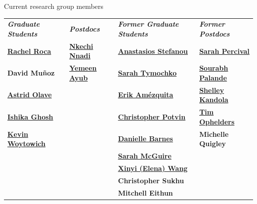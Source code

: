 \documentclass{resume} %
\begin{document}
\begin{rSection}{Current research group members}

\begin{tabular}{@{}llll@{}}
\textbf{\textit{Graduate Students}} & \textbf{\textit{Postdocs}} & \textbf{\textit{Former Graduate Students}} & \textbf{\textit{Former Postdocs}} \\[0.2em]
\textbf{\href{https://sites.google.com/manhattan.edu/racheleroca/home}{Rachel Roca}} & \textbf{\href{https://nkechic.org}{Nkechi Nnadi}} & \textbf{\href{https://sites.google.com/view/anastasiostefanou/home}{Anastasios Stefanou}} & \textbf{\href{https://www.math.unm.edu/~sarah/}{Sarah Percival}} \\
\textbf{David Muñoz} & \textbf{\href{https://yemeen.com/}{Yemeen Ayub}} & \textbf{\href{https://www.sarahtymochko.com/}{Sarah Tymochko}} & \textbf{\href{http://sci.utah.edu/~sourabh/}{Sourabh Palande}} \\
\textbf{\href{https://aaolaveh.github.io/}{Astrid Olave}} &  & \textbf{\href{https://ejamezquita.github.io/}{Erik Am\'ezquita}} & \textbf{\href{www.shelleykandola.com}{Shelley Kandola}} \\
\textbf{\href{https://www.ishikaghosh.com/}{Ishika Ghosh}} &  & \textbf{\href{https://sites.google.com/view/christopherpotvin/home}{Christopher Potvin}} & \textbf{\href{https://research.tue.nl/en/persons/tim-ae-ophelders}{Tim Ophelders}} \\
\textbf{\href{https://directory.natsci.msu.edu/directory/Profiles/Person/103810}{Kevin Woytowich}} &  & \textbf{\href{https://www.linkedin.com/in/danielle-k-barnes/}{Danielle Barnes}} & \textbf{Michelle Quigley} \\
 &  & \textbf{\href{https://www.sarah-mcguire.com/}{Sarah McGuire}} & \\
 &  & \textbf{\href{https://elenaxwang.com/}{Xinyi (Elena) Wang}} & \\
 &  & \textbf{Christopher Sukhu} & \\
 &  & \textbf{Mitchell Eithun} & \\
\end{tabular}






\end{rSection}
\end{document}
